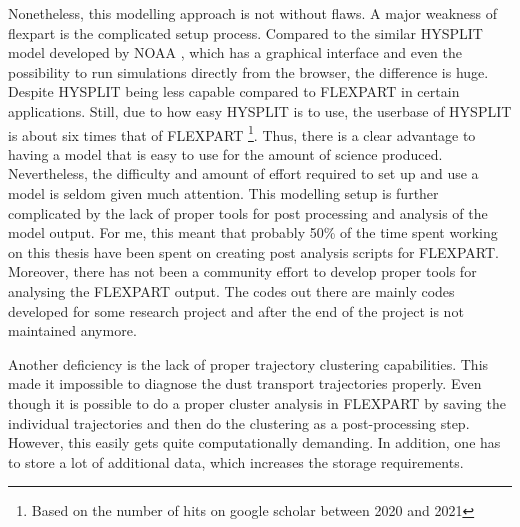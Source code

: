 Nonetheless, this modelling approach is not without flaws.
A major weakness of \acrshort{flexpart} is the complicated setup process.
Compared to the similar HYSPLIT model developed by NOAA \parencite{draxler2010hysplit}, which has a graphical interface and even the possibility to run simulations directly from the browser, the difference is huge. Despite HYSPLIT being less capable compared to FLEXPART in certain applications.
Still, due to how easy HYSPLIT is to use, the userbase of HYSPLIT is about six times that of FLEXPART \footnote{Based on the number of hits on google scholar between 2020 and 2021}. Thus, there is a clear advantage to having a model that is easy to use for the amount of science produced.   
Nevertheless, the difficulty and amount of effort required to set up and use a model is seldom given much attention. 
This modelling setup is further complicated by the lack of proper tools for post processing and analysis of the model output. 
For me, this meant that probably 50\% of the time spent working on this thesis have been spent on creating post analysis scripts for FLEXPART.
Moreover, there has not been a community effort to develop proper tools for analysing the FLEXPART output. 
The codes out there are mainly codes developed for some research project and after the end of the project is not maintained anymore.

Another deficiency is the lack of proper trajectory clustering capabilities. This made it impossible to diagnose the dust transport trajectories properly. 
Even though it is possible to do a proper cluster analysis in FLEXPART by saving the  individual trajectories and then do the clustering as a post-processing step. However, this easily gets quite computationally demanding. In addition, one has to store a lot of additional data, which increases the storage requirements.

